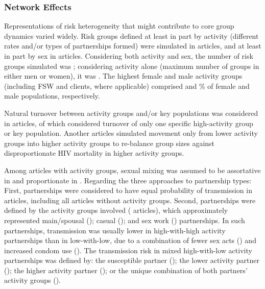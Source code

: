 \subsubsection{Network Effects}
\label{sss:res:network}
Representations of risk heterogeneity that might contribute to core group dynamics varied widely.
Risk groups defined at least in part by activity
(different rates and/or types of partnerships formed) were simulated in  articles,
and at least in part by sex in  articles.
Considering both activity and sex, the number of risk groups simulated was ;
considering activity alone (maximum number of groups in either men or women), it was .
The highest female and male activity groups (including FSW and clients, where applicable) comprised
 and  \% of female and male populations, respectively.
\par
Natural turnover between activity groups and/or key populations
was considered in  articles,
of which  considered turnover of only
one specific high-activity group or key population.
Another  articles simulated
movement only from lower activity groups into higher activity groups
to re-balance group sizes against disproportionate HIV mortality in higher activity groups.
\par
Among  articles with activity groups, sexual mixing was assumed to be
assortative in  and proportionate in .
Regarding the three approaches to partnership types:
First, partnerships were considered to have equal probability of transmission in
 articles, including all articles without activity groups.
Second, partnerships were defined by the activity groups involved ( articles),
which approximately represented
main/spousal ();
casual (); and
sex work () partnerships.
In such partnerships, transmission was usually
lower in high-with-high activity partnerships than in low-with-low, due to a combination of
fewer sex acts () and
increased condom use ().
The transmission risk in mixed high-with-low activity partnerships was defined by:
the susceptible partner ();
the lower activity partner ();
the higher activity partner (); or
the unique combination of both partners' activity groups ().
